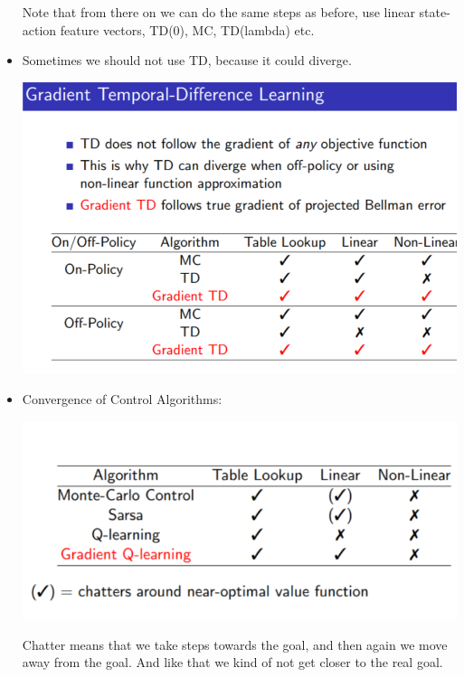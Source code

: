 \documentclass[a4paper]{article}
\begin{document}
\begin{itemize}
\begin{center}
    \end{center}
    Note that from there on we can do the same steps as before, use linear state-action feature vectors, TD(0), MC, TD(lambda) etc. 
    \item Sometimes we should not use TD, because it could diverge. 
    \begin{center}
    \includegraphics[width = \textwidth]{images/tdconvergence.png}
    \end{center}
    \item Convergence of Control Algorithms: 
    \begin{center}
    \includegraphics[width = \textwidth]{images/controlconvergence.png}
    \end{center}
    Chatter means that we take steps towards the goal, and then again we move away from the goal. And like that we kind of not get closer to the real goal. 
\end{itemize}
\end{document}
